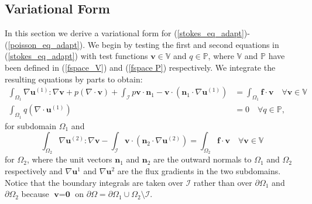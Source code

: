 \documentclass[12pt,a4paper]{article}
\theoremstyle{definition}
\begin{document}
\subsection{Variational Form}
In this section we derive a variational form for (\ref{stokes_eq_adapt})-(\ref{poisson_eq_adapt}).  We begin by testing the first and second equations in  (\ref{stokes_eq_adapt}) with test functions $\textbf{v}\in \mathbb{V}$ and $q\in \mathbb{P}$, where  $\mathbb{V}$ and $\mathbb{P}$ have been defined in (\ref{fspace_V}) and (\ref{fspace P}) respectively. We integrate the resulting equations by parts to obtain:
\begin{equation}\label{weak_stokes_1}
\begin{aligned}
\int_{\Omega_1}\nabla \textbf{u}^{\left(1\right)} : \nabla \textbf{v}+p\left(\nabla \cdot \textbf{v}\right) +\int_{\mathcal{I}} p\textbf{v}\cdot \textbf{n}_1-\textbf{v}\cdot\left(\textbf{n}_1\cdot\nabla\textbf{u}^{\left(1\right)}\right) &=\int_{\Omega_1}\textbf{f}\cdot \textbf{v}  \quad \forall  \textbf{v}\in \mathbb{V}\\
\int_{\Omega_1}q\left(\nabla \cdot \textbf{u}^{\left(1\right)}\right) &= 0\quad \forall q\in \mathbb{P},
\end{aligned}
\end{equation}
for subdomain $\Omega_1$ and
\begin{equation}\label{weak_poisson}
\int_{\Omega_2}\nabla \textbf{u}^{\left(2\right)} : \nabla \textbf{v} - \int_{\mathcal{I}} \textbf{v}\cdot\left(\textbf{n}_2\cdot\nabla\textbf{u}^{\left(2\right)}\right)= \int_{\Omega_2}\textbf{f}\cdot \textbf{v}  \quad \forall  \textbf{v}\in \mathbb{V}
\end{equation}
for $\Omega_2$, where the unit vectors $\textbf{n}_1$ and $\textbf{n}_2$ are the outward normals to $\Omega_{1}$ and $\Omega_{2}$ respectively and $\nabla \textbf{u}^1$ and $\nabla \textbf{u}^2$ are the flux gradients in the two subdomains. Notice that the boundary integrals are taken over $\mathcal{I}$ rather than over $\partial \Omega_{1}$ and $\partial \Omega_{2}$ because $\textbf{v}=\textbf{0}$ on $ \partial \Omega = \partial \Omega_1\cup \Omega_{2}\setminus \mathcal{I}$.   
\end{document}
